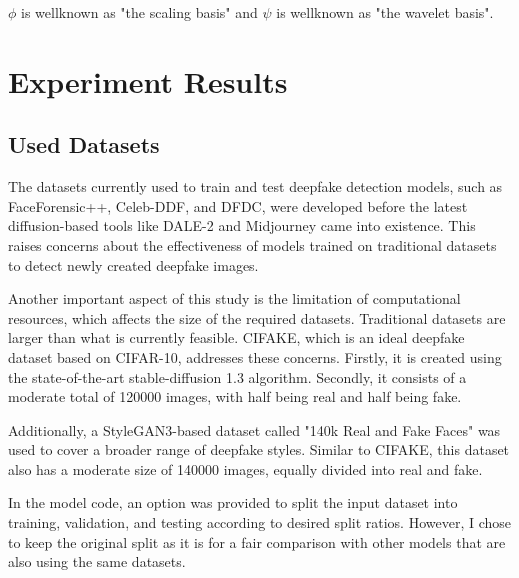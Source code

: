 \documentclass{svproc}
\begin{document}
\noindent
$\phi$ is wellknown as "the scaling basis" and $\psi$ is wellknown as "the wavelet basis".\\



\section{Experiment Results}
\subsection{Used Datasets}
The datasets currently used to train and test deepfake detection models,
such as FaceForensic++, Celeb-DDF, and DFDC, were developed before the latest
diffusion-based tools like DALE-2 and Midjourney came into existence. This
raises concerns about the effectiveness of models trained on traditional
datasets to detect newly created deepfake images.

Another important aspect of this study is the limitation of computational
resources, which affects the size of the required datasets. Traditional
datasets are larger than what is currently feasible. CIFAKE, which is an ideal
deepfake dataset based on CIFAR-10, addresses these concerns. Firstly, it is
created using the state-of-the-art stable-diffusion 1.3 algorithm. Secondly, it
consists of a moderate total of 120000 images, with half being real and half
being fake.

Additionally, a StyleGAN3-based dataset called "140k Real and Fake Faces" was
used to cover a broader range of deepfake styles. Similar to CIFAKE, this
dataset also has a moderate size of 140000 images, equally divided into real
and fake.

In the model code, an option was provided to split the input dataset into
training, validation, and testing according to desired split ratios. However, I
chose to keep the original split as it is for a fair comparison with other
models that are also using the same datasets.

\end{document}
